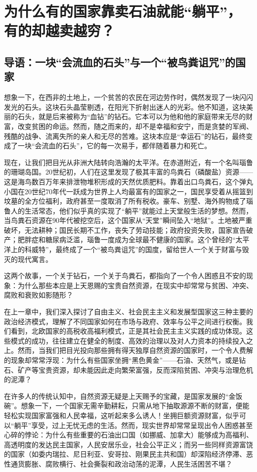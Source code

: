 \chapter{为什么有的国家靠卖石油就能“躺平”，有的却越卖越穷？}

\section{导语：一块“会流血的石头”与一个“被鸟粪诅咒”的国家}

想象一下，在西非的土地上，一个贫苦的农民在河边劳作时，偶然发现了一块闪闪发光的石头。这块石头晶莹剔透，在阳光下折射出迷人的光彩。他不知道，这块美丽的石头，就是后来被称为“血钻”的钻石。它本可以为他和他的家庭带来无尽的财富，改变贫困的命运。然而，随之而来的，却不是幸福和安宁，而是贪婪的军阀、残酷的战争、流离失所的亲人和无尽的苦难。这块本应是“幸运石”的钻石，最终变成了一块“会流血的石头”，它的每一次易手，都伴随着暴力和死亡。

现在，让我们把目光从非洲大陆转向浩瀚的太平洋。在赤道附近，有一个名叫瑙鲁的珊瑚岛国。20世纪初，人们在这里发现了极其丰富的鸟粪石（磷酸盐）资源——这是海鸟数百万年来排泄物堆积形成的天然优质肥料。靠着出口鸟粪石，这个弹丸小国在20世纪70年代一跃成为世界上人均最富有的国家之一，国民享受着从摇篮到坟墓的全方位福利，政府甚至一度取消了所有税收。豪车、别墅、海外购物成了瑙鲁人的生活常态，他们似乎真的实现了“躺平”就能过上天堂般生活的梦想。然而，当鸟粪石资源在90年代被挖空后，这个国家从“天堂”瞬间坠入“地狱”。土地被严重破坏，无法耕种；国民长期不工作，丧失了劳动技能；政府投资失败，国家宣告破产；肥胖症和糖尿病泛滥，瑙鲁一度成为全球最不健康的国家。这个曾经的“太平洋上的科威特”，最终成了一个“被鸟粪诅咒”的国度，留给世人一个关于财富与毁灭的现代寓言。

这两个故事，一个关于钻石，一个关于鸟粪石，都指向了一个令人困惑且不安的现象：为什么那些本应是上天恩赐的宝贵自然资源，在现实中却常常与贫困、冲突、腐败和衰败如影随形？

在上一章中，我们深入探讨了自由主义、社会民主主义和发展型国家这三种主要的政治经济模式，理解了不同国家如何在市场与政府、效率与公平之间进行权衡。我们看到，北欧国家的高税收高福利模式，正是其社会民主主义实践的成功体现。这些模式的成功，往往建立在健全的制度、高效的治理以及对人力资本的持续投入之上。然而，当我们把目光投向那些拥有得天独厚自然资源的国家时，一个令人费解的现象却常常浮现：为什么有些国家坐拥“黑色黄金”——石油、天然气，或是钻石、矿产等宝贵资源，却未能因此走向繁荣富强，反而深陷贫困、冲突与治理危机的泥潭？

在许多人的传统认知中，自然资源无疑是上天赐予的宝藏，是国家发展的“金饭碗”。想象一下，一个国家无需辛勤耕耘，只需从地下抽取源源不断的财富，便能轻松实现国家富强和人民幸福，这听起来多么诱人！坐拥巨额资源财富，似乎可以“躺平”享受，过上无忧无虑的生活。然而，现实世界却常常呈现出令人困惑甚至心碎的悖论：为什么有些重要的石油出口国（如挪威、加拿大）能够成为高福利、高透明度的发达民主国家，人民安居乐业，社会公平正义；而另一些同样资源富饶的国家（如委内瑞拉、尼日利亚、安哥拉、刚果民主共和国）却深陷经济停滞、恶性通货膨胀、腐败横行、社会撕裂和政治动荡的泥潭，人民生活困苦不堪？

